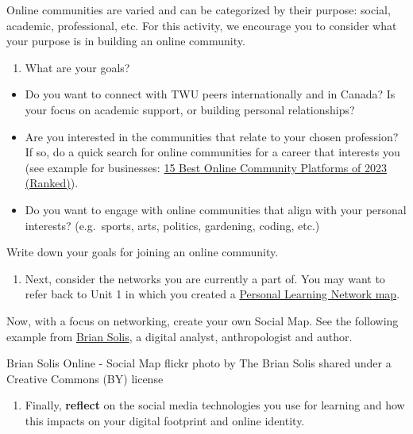\documentclass[
]{book}
\providecommand{\tightlist}{%
  \setlength{\itemsep}{0pt}\setlength{\parskip}{0pt}}
\theoremstyle{definition}
\theoremstyle{definition}
\theoremstyle{definition}
\theoremstyle{definition}
\theoremstyle{remark}
\begin{document}
\begin{reflect}
Online communities are varied and can be categorized by their purpose: social, academic, professional, etc. For this activity, we encourage you to consider what your purpose is in building an online community.

\begin{enumerate}
\def\labelenumi{\arabic{enumi}.}
\tightlist
\item
  What are your goals?
\end{enumerate}

\begin{itemize}
\tightlist
\item
  Do you want to connect with TWU peers internationally and in Canada? Is your focus on academic support, or building personal relationships?\\
\item
  Are you interested in the communities that relate to your chosen profession? If so, do a quick search for online communities for a career that interests you (see example for businesses: \href{https://www.mightynetworks.com/resources/community-platforms}{15 Best Online Community Platforms of 2023 (Ranked)}).\\
\item
  Do you want to engage with online communities that align with your personal interests? (e.g.~sports, arts, politics, gardening, coding, etc.)
\end{itemize}

Write down your goals for joining an online community.

\begin{enumerate}
\def\labelenumi{\arabic{enumi}.}
\setcounter{enumi}{1}
\tightlist
\item
  Next, consider the networks you are currently a part of. You may want to refer back to Unit 1 in which you created a \href{https://twu-innovation.github.io/inno101/introduction-to-digital-literacies-for-online-learning.html\#activity-pln-mapping-challenge}{Personal Learning Network map}.
\end{enumerate}

Now, with a focus on networking, create your own Social Map. See the following example from \href{https://www.briansolis.com/about/}{Brian Solis}, a digital analyst, anthropologist and author.

Brian Solis Online - Social Map flickr photo by The Brian Solis shared under a Creative Commons (BY) license

\begin{enumerate}
\def\labelenumi{\arabic{enumi}.}
\setcounter{enumi}{2}
\tightlist
\item
  Finally, \textbf{reflect} on the social media technologies you use for learning and how this impacts on your digital footprint and online identity.
\end{enumerate}
\end{reflect}
\end{document}
